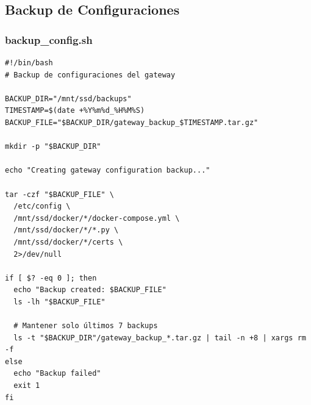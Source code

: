 \subsection{Backup de Configuraciones}

\subsubsection{backup\_config.sh}

\begin{verbatim}
#!/bin/bash
# Backup de configuraciones del gateway

BACKUP_DIR="/mnt/ssd/backups"
TIMESTAMP=$(date +%Y%m%d_%H%M%S)
BACKUP_FILE="$BACKUP_DIR/gateway_backup_$TIMESTAMP.tar.gz"

mkdir -p "$BACKUP_DIR"

echo "Creating gateway configuration backup..."

tar -czf "$BACKUP_FILE" \
  /etc/config \
  /mnt/ssd/docker/*/docker-compose.yml \
  /mnt/ssd/docker/*/*.py \
  /mnt/ssd/docker/*/certs \
  2>/dev/null

if [ $? -eq 0 ]; then
  echo "Backup created: $BACKUP_FILE"
  ls -lh "$BACKUP_FILE"
  
  # Mantener solo últimos 7 backups
  ls -t "$BACKUP_DIR"/gateway_backup_*.tar.gz | tail -n +8 | xargs rm -f
else
  echo "Backup failed"
  exit 1
fi
\end{verbatim}

